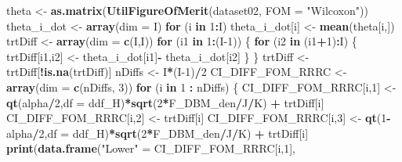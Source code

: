 \documentclass[
]{book}
\newenvironment{Shaded}{\begin{snugshade}}{\end{snugshade}}
\newcommand{\ControlFlowTok}[1]{\textcolor[rgb]{0.13,0.29,0.53}{\textbf{#1}}}
\newcommand{\DataTypeTok}[1]{\textcolor[rgb]{0.13,0.29,0.53}{#1}}
\newcommand{\DecValTok}[1]{\textcolor[rgb]{0.00,0.00,0.81}{#1}}
\newcommand{\KeywordTok}[1]{\textcolor[rgb]{0.13,0.29,0.53}{\textbf{#1}}}
\newcommand{\NormalTok}[1]{#1}
\newcommand{\OperatorTok}[1]{\textcolor[rgb]{0.81,0.36,0.00}{\textbf{#1}}}
\newcommand{\StringTok}[1]{\textcolor[rgb]{0.31,0.60,0.02}{#1}}
\begin{document}
\begin{Shaded}
\begin{Highlighting}[]
\NormalTok{theta <-}\StringTok{ }\KeywordTok{as.matrix}\NormalTok{(}\KeywordTok{UtilFigureOfMerit}\NormalTok{(dataset02, }\DataTypeTok{FOM =} \StringTok{"Wilcoxon"}\NormalTok{))}
\NormalTok{theta_i_dot <-}\StringTok{ }\KeywordTok{array}\NormalTok{(}\DataTypeTok{dim =}\NormalTok{ I)}
\ControlFlowTok{for}\NormalTok{ (i }\ControlFlowTok{in} \DecValTok{1}\OperatorTok{:}\NormalTok{I) theta_i_dot[i] <-}\StringTok{ }\KeywordTok{mean}\NormalTok{(theta[i,])}
\NormalTok{trtDiff <-}\StringTok{ }\KeywordTok{array}\NormalTok{(}\DataTypeTok{dim =} \KeywordTok{c}\NormalTok{(I,I))}
\ControlFlowTok{for}\NormalTok{ (i1 }\ControlFlowTok{in} \DecValTok{1}\OperatorTok{:}\NormalTok{(I}\DecValTok{-1}\NormalTok{)) \{    }
  \ControlFlowTok{for}\NormalTok{ (i2 }\ControlFlowTok{in}\NormalTok{ (i1}\OperatorTok{+}\DecValTok{1}\NormalTok{)}\OperatorTok{:}\NormalTok{I) \{}
\NormalTok{    trtDiff[i1,i2] <-}\StringTok{ }\NormalTok{theta_i_dot[i1]}\OperatorTok{-}\StringTok{ }\NormalTok{theta_i_dot[i2]    }
\NormalTok{  \}}
\NormalTok{\}}
\NormalTok{trtDiff <-}\StringTok{ }\NormalTok{trtDiff[}\OperatorTok{!}\KeywordTok{is.na}\NormalTok{(trtDiff)]}
\NormalTok{nDiffs <-}\StringTok{ }\NormalTok{I}\OperatorTok{*}\NormalTok{(I}\DecValTok{-1}\NormalTok{)}\OperatorTok{/}\DecValTok{2}
\NormalTok{CI_DIFF_FOM_RRRC <-}\StringTok{ }\KeywordTok{array}\NormalTok{(}\DataTypeTok{dim =} \KeywordTok{c}\NormalTok{(nDiffs, }\DecValTok{3}\NormalTok{))}
\ControlFlowTok{for}\NormalTok{ (i }\ControlFlowTok{in} \DecValTok{1} \OperatorTok{:}\StringTok{ }\NormalTok{nDiffs) \{}
\NormalTok{  CI_DIFF_FOM_RRRC[i,}\DecValTok{1}\NormalTok{] <-}\StringTok{ }\KeywordTok{qt}\NormalTok{(alpha}\OperatorTok{/}\DecValTok{2}\NormalTok{,}\DataTypeTok{df =}\NormalTok{ ddf_H)}\OperatorTok{*}\KeywordTok{sqrt}\NormalTok{(}\DecValTok{2}\OperatorTok{*}\NormalTok{F_DBM_den}\OperatorTok{/}\NormalTok{J}\OperatorTok{/}\NormalTok{K) }\OperatorTok{+}\StringTok{ }\NormalTok{trtDiff[i]}
\NormalTok{  CI_DIFF_FOM_RRRC[i,}\DecValTok{2}\NormalTok{] <-}\StringTok{ }\NormalTok{trtDiff[i]}
\NormalTok{  CI_DIFF_FOM_RRRC[i,}\DecValTok{3}\NormalTok{] <-}\StringTok{ }\KeywordTok{qt}\NormalTok{(}\DecValTok{1}\OperatorTok{-}\NormalTok{alpha}\OperatorTok{/}\DecValTok{2}\NormalTok{,}\DataTypeTok{df =}\NormalTok{ ddf_H)}\OperatorTok{*}\KeywordTok{sqrt}\NormalTok{(}\DecValTok{2}\OperatorTok{*}\NormalTok{F_DBM_den}\OperatorTok{/}\NormalTok{J}\OperatorTok{/}\NormalTok{K) }\OperatorTok{+}\StringTok{ }\NormalTok{trtDiff[i]}
  \KeywordTok{print}\NormalTok{(}\KeywordTok{data.frame}\NormalTok{(}\StringTok{"Lower"}\NormalTok{ =}\StringTok{ }\NormalTok{CI_DIFF_FOM_RRRC[i,}\DecValTok{1}\NormalTok{], }

\end{Highlighting}
\end{Shaded}
\end{document}
